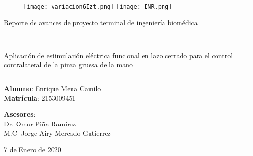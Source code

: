\begin{titlepage}
\begin{center}

\begin{figure}
	\centering
	\texttt{[image: variacion6Izt.png]}
	\hfill
	\texttt{[image: INR.png]}
\end{figure}

\hfill \break

\LARGE{Reporte de avances de proyecto terminal de ingeniería biomédica}

\vspace{1cm}

\rule{18cm}{0.5mm}\\
\LARGE{Aplicación de estimulación eléctrica funcional en lazo cerrado para el control contralateral de la pinza gruesa de la mano\\}
\rule{18cm}{0.5mm}

\vspace{1cm}

\Large{	\textbf{Alumno}: Enrique Mena Camilo\\
		\textbf{Matrícula}: 2153009451\\}

\vspace{1cm}

\Large{\textbf{Asesores}:\\Dr. Omar Piña Ramirez\\M.C. Jorge Airy Mercado Gutierrez}

\vspace{1cm}

\Large{7 de Enero de 2020}

\end{center}
\end{titlepage}